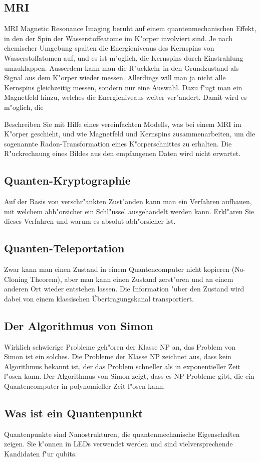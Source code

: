 \subsection{MRI}
MRI Magnetic Resonance Imaging beruht auf einem quantenmechanischen
Effekt, in den der Spin der Wasserstoffeatome im K"orper involviert
sind. Je nach chemischer Umgebung spalten die Energieniveaus des
Kernspins von Wasserstoffatomen auf, und es ist m"oglich, die Kernspins
durch Einstrahlung umzuklappen. Ausserdem kann man die R"uckkehr in
den Grundzustand als Signal aus dem K"orper wieder messen. Allerdings
will man ja nicht alle Kernspins gleichzeitig messen, sondern nur
eine Auswahl. Dazu f"ugt man ein Magnetfeld hinzu, welches die
Energieniveaus weiter ver"andert. Damit wird es m"oglich, die

Beschreiben Sie mit Hilfe eines vereinfachten Modells, was bei einem
MRI im K"orper geschieht, und wie Magnetfeld und Kernspins
zusammenarbeiten, um die sogenannte Radon-Transformation eines
K"orperschnittes zu erhalten. Die R"uckrechnung eines Bildes aus den
empfangenen Daten wird nicht erwartet.

\subsection{Quanten-Kryptographie}
Auf der Basis von verschr"ankten Zust"anden kann man ein Verfahren
aufbauen, mit welchem abh"orsicher ein Schl"ussel ausgehandelt werden
kann. Erkl"aren Sie dieses Verfahren und warum es absolut abh"orsicher
ist.

\subsection{Quanten-Teleportation}
Zwar kann man einen Zustand in einem Quantencomputer nicht kopieren
(No-Cloning Theorem), aber man kann einen Zustand zerst"oren und an
einem anderen Ort wieder entstehen lassen. Die Information "uber den
Zustand wird dabei von einem klassischen Übertragungskanal
transportiert.

\subsection{Der Algorithmus von Simon}
Wirklich schwierige Probleme geh"oren der Klasse NP an, das Problem
von Simon ist ein solches. Die Probleme der Klasse NP zeichnet aus,
dass kein Algorithmus bekannt ist, der das Problem schneller als
in exponentieller Zeit l"osen kann. Der Algorithmus von Simon zeigt,
dass es NP-Probleme gibt, die ein Quantencomputer in polynomieller
Zeit l"osen kann.

\subsection{Was ist ein Quantenpunkt}
Quantenpunkte sind Nanostrukturen, die quantenmechanische Eigenschaften
zeigen. Sie k"onnen in LEDs verwendet werden und sind  vielversprechende
Kandidaten f"ur qubits.


